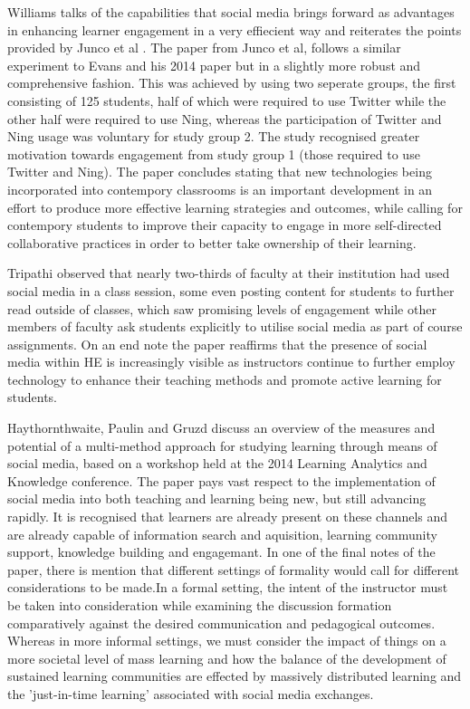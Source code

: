 \documentclass[lettersize,journal]{IEEEtran}
\begin{document}
    Williams \cite{Williams2022} talks of the capabilities that social media brings
    forward as advantages in enhancing learner engagement in a very effiecient way
    and reiterates the points provided by Junco et al \cite{Junco et al 2013}.
    The paper from Junco et al, follows a similar experiment to Evans and his 2014
    paper \cite{Evans2014} but in a slightly more robust and comprehensive fashion.
    This was achieved by using two seperate groups, the first consisting of 125
    students, half of which were required to use Twitter while the other half were
    required to use Ning, whereas the participation of Twitter and Ning usage was
    voluntary for study group 2. The study recognised greater motivation towards
    engagement from study group 1 (those required to use Twitter and Ning). The
    paper concludes stating that new technologies being incorporated into contempory
    classrooms is an important development in an effort to produce more effective
    learning strategies and outcomes, while calling for contempory students to
    improve their capacity to engage in more self-directed collaborative practices
    in order to better take ownership of their learning.

    Tripathi \cite{Tripathi 2022} observed that nearly two-thirds of faculty at
    their institution had used social media in a class session, some even
    posting content for students to further read outside of classes, which saw
    promising levels of engagement while other members of faculty ask students
    explicitly to utilise social media as part of course assignments. On an end
    note the paper reaffirms that the presence of social media within HE is
    increasingly visible as instructors continue to further employ technology
    to enhance their teaching methods and promote active learning for students.

    Haythornthwaite, Paulin and Gruzd \cite{Haythornthwaite et al 2016}  discuss
    an overview of the measures and potential of a multi-method approach for studying learning
    through means of social media, based on a workshop held at the 2014 Learning
    Analytics and Knowledge conference. The paper pays vast respect to the
    implementation of social media into both teaching and learning being new,
    but still advancing rapidly. It is recognised that learners are already
    present on these channels and are already capable of information search and
    aquisition, learning community support, knowledge building and engagemant.
    In one of the final notes of the paper, there is mention that different
    settings of formality would call for different considerations to be made.In
    a formal setting, the intent of the instructor must be taken into
    consideration while examining the discussion formation comparatively against
    the desired communication and pedagogical outcomes. Whereas in more informal
    settings, we must consider the impact of things on a more societal level of
    mass learning and how the balance of the development of sustained learning
    communities are effected by massively distributed learning and the
    'just-in-time learning' associated with social media exchanges.
\end{document}
